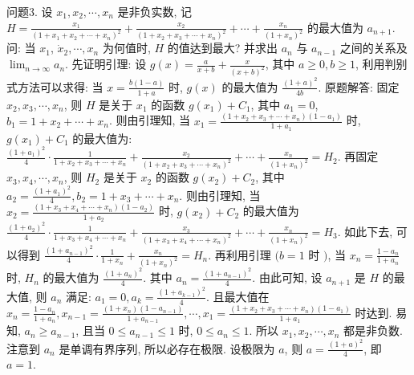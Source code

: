 问题3. 设 $x_1, x_2, \cdots, x_n$ 是非负实数, 记 $H=\frac{x_1}{\left(1+x_1+x_2+\cdots+x_n\right)^2}+ \frac{x_2}{\left(1+x_2+x_3+\cdots+x_n\right)^2}+\cdots+\frac{x_n}{\left(1+x_n\right)^2}$ 的最大值为 $a_{n+1}$. 问: 当 $x_1$, $\dot{x}_2, \cdots, x_n$ 为何值时, $H$ 的值达到最大? 并求出 $a_n$ 与 $a_{n-1}$ 之间的关系及 $\lim _{n \rightarrow \infty} a_n$.
先证明引理: 设 $g(x)=\frac{a}{x+b}+\frac{x}{(x+b)^2}$, 其中 $a \geqslant 0, b \geqslant 1$, 利用判别式方法可以求得: 当 $x=\frac{b(1-a)}{1+a}$ 时, $g(x)$ 的最大值为 $\frac{(1+a)^2}{4 b}$. 原题解答: 固定 $x_2, x_3, \cdots, x_n$, 则 $H$ 是关于 $x_1$ 的函数 $g\left(x_1\right)+C_1$, 其中 $a_1=0$, $b_1=1+x_2+\cdots+x_n$. 则由引理知, 当 $x_1=\frac{\left(1+x_2+x_3+\cdots+x_n\right)\left(1-a_1\right)}{1+a_1}$ 时, $g\left(x_1\right)+C_1$ 的最大值为: $\frac{\left(1+a_1\right)^2}{4} \cdot \frac{1}{1+x_2+x_3+\cdots+x_n}+ \frac{x_2}{\left(1+x_2+x_3+\cdots+x_n\right)^2}+\cdots+\frac{x_n}{\left(1+x_n\right)^2}=H_2$. 再固定 $x_3, x_4, \cdots, x_n$, 则 $H_2$ 是关于 $x_2$ 的函数 $g\left(x_2\right)+C_2$, 其中 $a_2=\frac{\left(1+a_1\right)^2}{4}, b_2=1+x_3+\cdots+x_n$. 则由引理知, 当 $x_2=\frac{\left(1+x_3+x_4+\cdots+x_n\right)\left(1-a_2\right)}{1+a_2}$ 时, $g\left(x_2\right)+C_2$ 的最大值为 $\frac{\left(1+a_2\right)^2}{4} \cdot \frac{1}{1+x_3+x_4+\cdots+x_n}+\frac{x_3}{\left(1+x_3+x_4+\cdots+x_n\right)^2}+\cdots+ \frac{x_n}{\left(1+x_n\right)^2}=H_3$. 如此下去, 可以得到 $\frac{\left(1+a_{n-1}\right)^2}{4} \cdot \frac{1}{1+x_n}+\frac{x_n}{\left(1+x_n\right)^2}=H_n$.
再利用引理 $(b=1$ 时 $)$, 当 $x_n=\frac{1-a_n}{1+a_n}$ 时, $H_n$ 的最大值为 $\frac{\left(1+a_n\right)^2}{4}$. 其中 $a_n= \frac{\left(1+a_{n-1}\right)^2}{4}$. 由此可知, 设 $a_{n+1}$ 是 $H$ 的最大值, 则 $a_n$ 满足: $a_1=0, a_k= \frac{\left(1+a_{k-1}\right)^2}{4}$. 且最大值在 $x_n=\frac{1-a_n}{1+a_n}, x_{n-1}=\frac{\left(1+x_n\right)\left(1-a_{n-1}\right)}{1+a_{n-1}}, \cdots, x_1= \frac{\left(1+x_2+x_3+\cdots+x_n\right)\left(1-a_1\right)}{1+a_1}$ 时达到.
易知, $a_n \geqslant a_{n-1}$, 且当 $0 \leqslant a_{n-1} \leqslant 1$ 时, $0 \leqslant a_n \leqslant 1$. 所以 $x_1, x_2, \cdots, x_n$ 都是非负数.
注意到 $a_n$ 是单调有界序列, 所以必存在极限.
设极限为 $a$, 则 $a=\frac{(1+a)^2}{4}$, 即 $a=1$.



